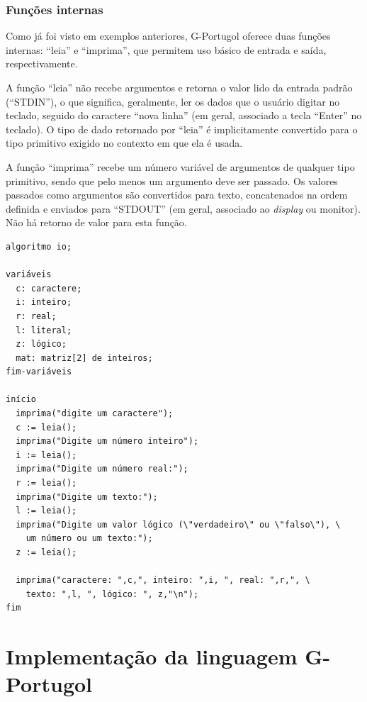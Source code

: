 \documentclass[a4paper,11pt]{report}
\begin{document}
\subsection{Funções internas}

Como já foi visto em exemplos anteriores, G-Portugol oferece duas funções
internas: ``leia'' e ``imprima'', que permitem uso básico de entrada e saída,
respectivamente.

A função ``leia'' não recebe argumentos e retorna o valor lido da entrada padrão
(``STDIN''), o que significa, geralmente, ler os dados que o usuário digitar no
teclado, seguido do caractere ``nova linha'' (em geral, associado a tecla
``Enter'' no teclado). O tipo de dado retornado por ``leia'' é implicitamente
convertido para o tipo primitivo exigido no contexto em que ela é usada.

A função ``imprima'' recebe um número variável de argumentos de qualquer tipo
primitivo, sendo que pelo menos um argumento deve ser passado. Os valores
passados como argumentos são convertidos para texto, concatenados na ordem
definida e enviados para ``STDOUT'' (em geral, associado ao \textit{display} ou
monitor). Não há retorno de valor para esta função.

\begin{program}
 \begin{verbatim}
algoritmo io;

variáveis
  c: caractere;
  i: inteiro;
  r: real;
  l: literal;
  z: lógico;
  mat: matriz[2] de inteiros;
fim-variáveis

início
  imprima("digite um caractere");
  c := leia();
  imprima("Digite um número inteiro");
  i := leia();
  imprima("Digite um número real:");
  r := leia();
  imprima("Digite um texto:");
  l := leia();
  imprima("Digite um valor lógico (\"verdadeiro\" ou \"falso\"), \
    um número ou um texto:");
  z := leia();

  imprima("caractere: ",c,", inteiro: ",i, ", real: ",r,", \
    texto: ",l, ", lógico: ", z,"\n");
fim
  \end{verbatim}

  \caption{Exemplo de usos das funções internas ``leia'' e ``imprima''.}
\end{program}


\chapter{Implementação da linguagem G-Portugol}
\label{ch:impl}
\end{document}

